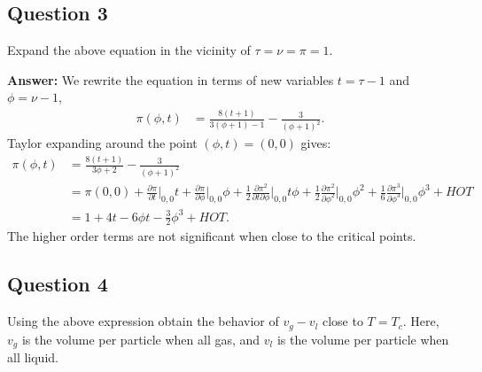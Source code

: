 \documentclass[a4paper]{article}
\newcommand{\newparagraph}{\vspace{.5cm}\noindent}
\begin{document}
\subsection*{Question 3}
Expand the above equation in the vicinity of $\tau = \nu = \pi = 1$.

\newparagraph
\textbf{Answer: }We rewrite the equation in terms of new variables $t = \tau - 1$ and $\phi = \nu - 1$,
\begin{align*}
    \pi(\phi, t) &= \frac{8(t + 1)}{3(\phi + 1) - 1} - \frac{3}{(\phi + 1)^2}.
\end{align*}Taylor expanding around the point $(\phi, t) = (0,0)$ gives:
\begin{align}
    \pi(\phi, t) &= \frac{8(t + 1)}{3\phi + 2} - \frac{3}{(\phi + 1)^2}\nonumber\\
    &= \pi(0,0) + \frac{\partial \pi}{\partial t}\Big|_{0,0}t +\frac{\partial \pi}{\partial \phi}\Big|_{0,0}\phi + \frac{1}{2}\frac{\partial \pi^2}{\partial t\partial \phi}\Big|_{0,0}t\phi + \frac{1}{2}\frac{\partial \pi^2}{\partial \phi^2}\Big|_{0,0}\phi^2 + \frac{1}{6}\frac{\partial \pi^3}{\partial \phi^3}\Big|_{0,0}\phi^3 + HOT\nonumber\\
    &= 1 + 4t - 6\phi t -\frac{3}{2}\phi^3 + HOT.\label{eq: expansion}
\end{align}The higher order terms are not significant when close to the critical points.


\subsection*{Question 4}
Using the above expression obtain the behavior of $v_g - v_l$ close to $T = T_c$. Here, $v_g$ is the volume per particle when all gas, and $v_l$ is the volume per particle when all liquid.
\end{document}
